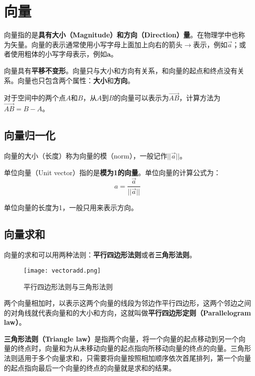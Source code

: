\documentclass[openany]{progbookcn}
\begin{document}
\section{向量}

向量指的是\textbf{具有大小（Magnitude）和方向（Direction）量}。在物理学中也称为矢量。向量的表示通常使用小写字母上面加上向右的箭头$\rightarrow$表示，例如$\overrightarrow{a}$；或者使用粗体的小写字母表示，例如$\textbf{a}$。

向量具有\textbf{平移不变形}。向量只与大小和方向有关系，和向量的起点和终点没有关系。向量也只包含两个属性：\textbf{大小}和\textbf{方向}。

对于空间中的两个点$A$和$B$，从$A$到$B$的向量可以表示为$\overrightarrow{AB}$，计算方法为$\overrightarrow{AB}=B-A$。

\subsection{向量归一化}

向量的大小（长度）称为向量的模（norm），一般记作$||\overrightarrow{a}||$。

单位向量（Unit vector）指的是\textbf{模为1的向量}。单位向量的计算公式为：
\begin{equation}
\hat{a}=\frac{\overrightarrow{a}}{||\overrightarrow{a}||}
\end{equation}

单位向量的长度为1，一般只用来表示方向。

\subsection{向量求和}
向量的求和可以用两种法则：\textbf{平行四边形法则}或者\textbf{三角形法则}。

\begin{figure}[H]
  \centering
  \texttt{[image: vectoradd.png]}
  \caption{平行四边形法则与三角形法则}
  \label{fig:vectoradd}
\end{figure}

两个向量相加时，以表示这两个向量的线段为邻边作平行四边形，这两个邻边之间的对角线就代表向量和的大小和方向，这就叫做\textbf{平行四边形定则（Parallelogram law）}。

\textbf{三角形法则（Triangle law）}是指两个向量，将一个向量的起点移动到另一个向量的终点时，向量和为从未移动向量的起点指向所移动向量的终点的向量。三角形法则适用于多个向量求和，只需要将向量按照相加顺序依次首尾排列，第一个向量的起点指向最后一个向量的终点的向量就是求和的结果。
\end{document}
